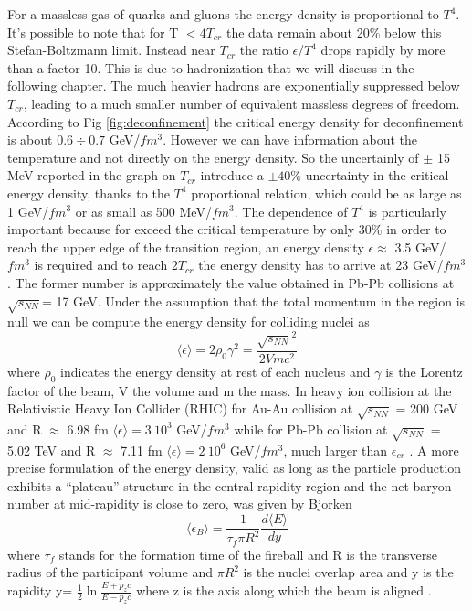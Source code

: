 \documentclass[12pt,a4paper]{book}
\begin{document}
	For a massless gas of quarks and gluons the energy density is proportional to $T^4$.  It's possible to note that for T $ <4T_{cr}$ the data remain about 20\% below this Stefan-Boltzmann limit. Instead near $T_{cr}$ the ratio $\epsilon$/$T^4$ drops rapidly by more than a factor 10. This is due to hadronization that we will discuss in the following chapter. The much heavier hadrons are exponentially suppressed below $T_{cr}$, leading to a much smaller number of equivalent massless degrees of freedom. According to Fig \ref{fig:deconfinement} the critical energy density for deconfinement is about $0.6 \div 0.7$ GeV/$fm^3$. However we can have information about the temperature and not directly on the energy density. So the uncertainly of $\pm$ 15 MeV reported in the graph on $T_{cr}$ introduce a $\pm 40 \%$ uncertainty in the critical energy density, thanks to the $T^4$ proportional relation, which could be as large as 1 GeV/$fm^3$ or as small as 500 MeV/$fm^3$. The dependence of $T^4$ is particularly important because for exceed the critical temperature by only 30\% in order to reach the upper edge of the transition region, an energy density $\epsilon \approx$  3.5 GeV/$fm^3$ is required and to reach 2$T_{cr}$ the energy density has to arrive at 23 GeV/$fm^3$ \cite{heinz2004conceptsheavyionphysics}. The former number is approximately the value obtained in Pb-Pb collisions at $\sqrt{s_{NN}}$= 17 GeV. Under the assumption that the total momentum in the region is null we can be compute the energy density for colliding nuclei as
	\begin{equation}
		\langle \epsilon \rangle = 2 \rho_0 \gamma^2 = \frac{\sqrt{s_{NN}}^2}{2 V mc^2}
	\end{equation} 
	where $\rho_0$  indicates the energy density at rest of each nucleus and $\gamma$ is the Lorentz factor of the beam, V the volume and m the mass. In heavy ion collision at the Relativistic Heavy Ion Collider (RHIC) for Au-Au collision at $\sqrt{s_{NN}}$ = 200 GeV and R $\approx$ 6.98 fm $\langle \epsilon \rangle = 3 \  10^3$ GeV/$fm^3$ while for Pb-Pb collision at $\sqrt{s_{NN}}$ = 5.02 TeV and R $\approx$ 7.11 fm $\langle \epsilon \rangle = 2 \  10^6$ GeV/$fm^3$, much larger than $\epsilon_{cr}$ \cite{Acharya_2024} . A more precise formulation of the energy density, valid as long as the particle production exhibits a “plateau” structure in the central rapidity region and the net baryon number at mid-rapidity is close to zero, was given by Bjorken \cite{PhysRevD.27.140}
	\begin{equation}
		\langle \epsilon_B \rangle = \frac{1}{\tau_f \pi R^2} \frac{d \langle E \rangle}{dy}
	\end{equation}
	where $\tau_f$ stands for the formation time of the fireball and R is the transverse radius of the participant volume and $\pi R^2$ is the nuclei overlap area and y is the rapidity y= $\frac{1}{2} \ln \frac{E+ p_z c} {E - p_z c}$ where z is the axis along which the beam is aligned \cite{amsdottorato9036}. 
	
\end{document}

